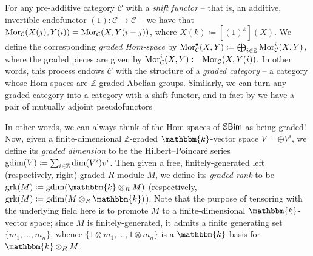 \noindent For any pre-additive category $\mathcal{C}$ with a {\em shift functor} -- that is, an additive, invertible endofunctor ${(1) : \mathcal{C} \to \mathcal{C}}$ -- we have that $\textnormal{Mor}_\mathcal{C}(X(j), Y(i)) = \textnormal{Mor}_\mathcal{C}(X, Y(i-j))$, where $X(k) \coloneqq [(1)^k](X)$. We define the corresponding {\em graded Hom-space} by $\textnormal{Mor}^\bullet_\mathcal{C}(X, Y) \coloneqq \bigoplus_{i\in\mathbb{Z}} \textnormal{Mor}_\mathcal{C}^i(X, Y)$, where the graded pieces are given by $\textnormal{Mor}_\mathcal{C}^i(X, Y) \coloneqq \textnormal{Mor}_\mathcal{C}(X, Y(i))$. In other words, this process endows $\mathcal{C}$ with the structure of a {\em graded category} -- a category whose Hom-spaces are $\mathbb{Z}$-graded Abelian groups. Similarly, we can turn any graded category into a category with a shift functor, and in fact by \cite[Proposition 11.9]{EMTW20} we have a pair of mutually adjoint pseudofunctors
\begin{center}
\end{center}
\noindent In other words, we can always think of the Hom-spaces of $\mathbb{S}\textnormal{\textsf{Bim}}$ as being graded!\\

\noindent Now, given a finite-dimensional $\mathbb{Z}$-graded $\mathbbm{k}$-vector space $V = \oplus V^i$, we define its {\em graded dimension} to be the Hilbert--Poincar\'{e} series $\textup{gdim}(V) \coloneqq \sum_{i \in \mathbb{Z}}{\textup{dim}(V^i)v^i}$. Then given a free, finitely-generated left (respectively, right) graded $R$-module $M$, we define its {\em graded rank} to be $\textup{grk}(M) \coloneqq \textup{gdim}(\mathbbm{k} \otimes_R M)$ (respectively, $\textup{grk}(M) \coloneqq \textup{gdim}(M \otimes_R \mathbbm{k})$). Note that the purpose of tensoring with the underlying field here is to promote $M$ to a finite-dimensional $\mathbbm{k}$-vector space; since $M$ is finitely-generated, it admits a finite generating set $\{m_1, \dots, m_n\}$, whence $\{1 \otimes m_1, \dots, 1 \otimes m_n\}$ is a $\mathbbm{k}$-basis for $\mathbbm{k} \otimes_R M$.\\

